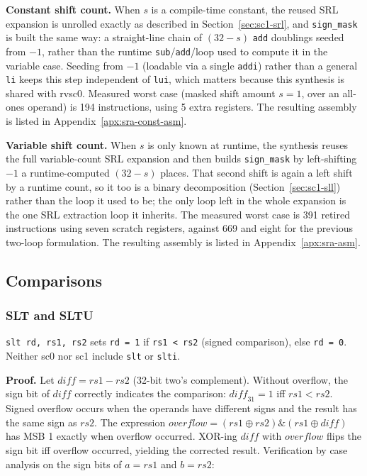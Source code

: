 \textbf{Constant shift count.} When $s$ is a compile-time constant, the reused SRL expansion is
unrolled exactly as described in Section~\ref{sec:sc1-srl}, and \texttt{sign\_mask} is built the same
way: a straight-line chain of $(32-s)$ \texttt{add} doublings seeded from $-1$, rather than the
runtime \texttt{sub}/\texttt{add}/loop used to compute it in the variable case. Seeding from $-1$
(loadable via a single \texttt{addi}) rather than a general \texttt{li} keeps this step independent of
\texttt{lui}, which matters because this synthesis is shared with rvsc0. Measured worst case (masked
shift amount $s = 1$, over an all-ones operand) is 194 instructions, using 5 extra registers. The
resulting assembly is listed in Appendix~\ref{apx:sra-const-asm}.

\textbf{Variable shift count.} When $s$ is only known at runtime, the synthesis reuses the full
variable-count SRL expansion and then builds \texttt{sign\_mask} by left-shifting $-1$ a
runtime-computed $(32-s)$ places. That second shift is again a left shift by a runtime count, so it
too is a binary decomposition (Section~\ref{sec:sc1-sll}) rather than the loop it used to be; the only
loop left in the whole expansion is the one SRL extraction loop it inherits. The measured worst case
is 391 retired instructions using seven scratch registers, against 669 and eight for the previous
two-loop formulation. The resulting assembly is listed in Appendix~\ref{apx:sra-asm}.

\subsection{Comparisons} \label{sec:sc1-comparisons}

\subsubsection{SLT and SLTU} \label{sec:sc1-slt}

\texttt{slt rd, rs1, rs2} sets \texttt{rd = 1} if \texttt{rs1 < rs2} (signed comparison), else
\texttt{rd = 0}. Neither sc0 nor sc1 include \texttt{slt} or \texttt{slti}.

\textbf{Proof.} Let $\mathit{diff} = \mathit{rs1} - \mathit{rs2}$ (32-bit two's complement). Without
overflow, the sign bit of $\mathit{diff}$ correctly indicates the comparison: $\mathit{diff}_{31} = 1$
iff $\mathit{rs1} < \mathit{rs2}$. Signed overflow occurs when the operands have different signs and
the result has the same sign as $\mathit{rs2}$. The expression
$\mathit{overflow} = (\mathit{rs1} \oplus \mathit{rs2}) \mathbin{\&} (\mathit{rs1} \oplus
\mathit{diff})$ has MSB 1 exactly when overflow occurred. XOR-ing $\mathit{diff}$ with
$\mathit{overflow}$ flips the sign bit iff overflow occurred, yielding the corrected result.
Verification by case analysis on the sign bits of $a = \mathit{rs1}$ and $b = \mathit{rs2}$:

